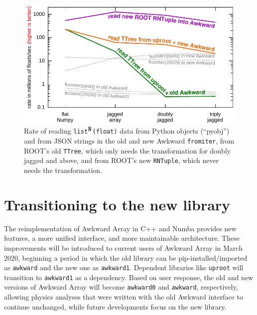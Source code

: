 \documentclass{webofc}
\begin{document}
\begin{figure}
\begin{center}
\includegraphics[width=0.75\linewidth]{read_ttree.pdf}
\end{center}

\vspace{-0.25 cm}
\caption{Rate of reading {\tt list}$^{\mbox{\tt N}}${\tt (float)} data from Python objects (``pyobj'') and from JSON strings in the old and new Awkward \texttt{fromiter}, from ROOT's old \texttt{TTree}, which only needs the transformation for doubly jagged and above, and from ROOT's new \texttt{RNTuple}, which never needs the transformation. \label{fig:read_ttree}}
\end{figure}


\section{Transitioning to the new library}

The reimplementation of Awkward Array in C++ and Numba provides new features, a more unified interface, and more maintainable architecture. These improvements will be introduced to current users of Awkward Array in March 2020, beginning a period in which the old library can be pip-installed/imported as \texttt{awkward} and the new one as \texttt{awkward1}. Dependent libraries like \texttt{uproot} will transition to \texttt{awkward1} as a dependency. Based on user response, the old and new versions of Awkward Array will become \texttt{awkward0} and \texttt{awkward}, respectively, allowing physics analyses that were written with the old Awkward interface to continue unchanged, while future developments focus on the new library.
\end{document}
